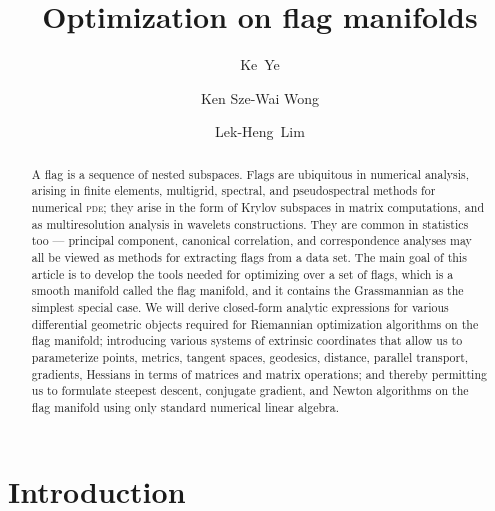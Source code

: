 \documentclass[11pt,reqno]{amsart}%
\theoremstyle{definition}
\theoremstyle{remark}
\begin{document}
\title{Optimization on flag manifolds}
\author[K.~Ye]{Ke~Ye}
\address{KLMM, Academy of Mathematics and Systems Science, Chinese Academy of Sciences,
Beijing 100190, China}
\author[K.~S.-W.~Wong]{Ken Sze-Wai Wong}
\address{Department of Statistics,
University of Chicago, Chicago, IL 60637-1514.}
\author[L.-H.~Lim]{Lek-Heng~Lim}
\address{Computational and Applied Mathematics Initiative, Department of Statistics,
University of Chicago, Chicago, IL 60637-1514.}

\begin{abstract}
A flag is a sequence of nested subspaces.  Flags are ubiquitous in numerical analysis, arising in finite elements, multigrid, spectral, and pseudospectral methods for numerical \textsc{pde}; they arise in the form of Krylov subspaces in matrix computations, and as multiresolution analysis in wavelets constructions. They are common in statistics too --- principal component, canonical correlation, and correspondence analyses may all be viewed as methods for extracting flags from a data set. The main goal of this article is to develop the tools needed for optimizing over a set of flags, which is a smooth manifold called the flag manifold, and it contains the Grassmannian as the simplest special case. We will derive closed-form analytic expressions for various differential geometric objects required for Riemannian optimization algorithms on the flag manifold; introducing various systems of extrinsic coordinates that allow us to parameterize points, metrics, tangent spaces, geodesics, distance, parallel transport, gradients, Hessians in terms of matrices and matrix operations; and thereby permitting us to formulate steepest descent, conjugate  gradient, and Newton algorithms on the flag manifold using only standard numerical linear algebra.

\end{abstract}




\maketitle

\section{Introduction}
\end{document}
